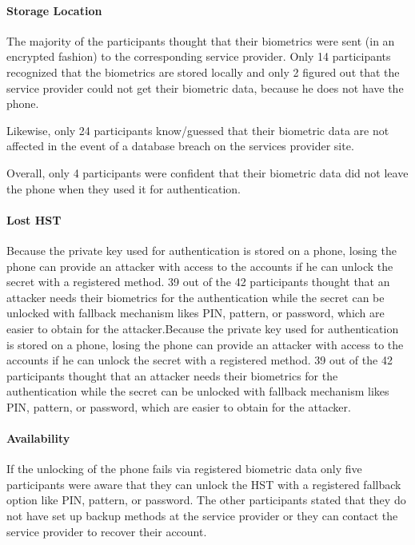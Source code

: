\documentclass[runningheads]{llncs}
\begin{document}
\paragraph{Storage Location}
The majority of the participants thought that their biometrics were sent (in an encrypted fashion) to the corresponding service provider. Only 14 participants recognized that the biometrics are stored locally and only 2 figured out that the service provider could not get their biometric data, because he does not have the phone.

Likewise, only 24 participants know/guessed that their biometric data are not affected in the event of a database breach on the services provider site.

Overall, only 4 participants were confident that their biometric data did not leave the phone when they used it for authentication.

\paragraph{Lost HST}
Because the private key used for authentication is stored on a phone, losing the phone can provide an attacker with access to the accounts if he can unlock the secret with a registered method. 39 out of the 42 participants thought that an attacker needs their biometrics for the authentication while the secret can be unlocked with fallback mechanism likes PIN, pattern, or password, which are easier to obtain for the attacker.Because the private key used for authentication is stored on a phone, losing the phone can provide an attacker with access to the accounts if he can unlock the secret with a registered method. 39 out of the 42 participants thought that an attacker needs their biometrics for the authentication while the secret can be unlocked with fallback mechanism likes PIN, pattern, or password, which are easier to obtain for the attacker.

\paragraph{Availability}
If the unlocking of the phone fails via registered biometric data only five participants were aware that they can unlock the HST with a registered fallback option like PIN, pattern, or password. The other participants stated that they do not have set up backup methods at the service provider or they can contact the service provider to recover their account.
\end{document}
